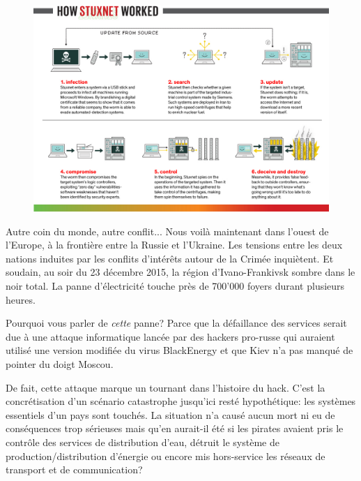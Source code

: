 \documentclass[article, french]{yReport}
\begin{document}
	\begin{figure}[ht!]
		\includegraphics[width=\textwidth]{images/stuxnet.jpg}
		\label{fig:stuxnet}
	\end{figure}
	
	Autre coin du monde, autre conflit...
	Nous voilà maintenant dans l'ouest de l'Europe, à la frontière entre la Russie et l'Ukraine.
	Les tensions entre les deux nations induites par les conflits d'intérêts autour de la Crimée inquiètent.
	Et soudain, au soir du 23 décembre 2015, la région d'Ivano-Frankivsk sombre dans le noir total.
	La panne d'électricité touche près de 700'000 foyers durant plusieurs heures.
	
	Pourquoi vous parler de \textit{cette} panne? Parce que la défaillance des services serait due à une attaque informatique lancée par des hackers pro-russe qui auraient utilisé une version modifiée du virus BlackEnergy et que Kiev n'a pas manqué de pointer du doigt Moscou.
	
	De fait, cette attaque marque un tournant dans l'histoire du hack.
	C'est la concrétisation d'un scénario catastrophe jusqu'ici resté hypothétique: les systèmes essentiels d'un pays sont touchés.
	La situation n'a causé aucun mort ni eu de conséquences trop sérieuses mais qu'en aurait-il été si les pirates avaient pris le contrôle des services de distribution d'eau, détruit le système de production/distribution d'énergie ou encore mis hors-service les réseaux de transport et de communication?
	
\end{document}
